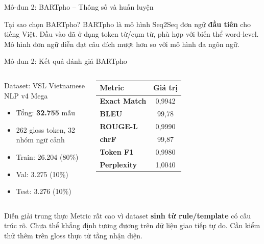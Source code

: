 ﻿\documentclass[aspectratio=169, 11pt]{beamer}
\begin{document}
\begin{frame}{Mô-đun 2: BARTpho -- Thông số và huấn luyện}
    \vspace{0.3cm}
    \begin{alertblock}{\small Tại sao chọn BARTpho?}
        \small BARTpho là mô hình Seq2Seq đơn ngữ \textbf{đầu tiên} cho tiếng Việt. Đầu vào đã ở dạng token từ/cụm từ, phù hợp với biến thể word-level. Mô hình đơn ngữ diễn đạt câu đích mượt hơn so với mô hình đa ngôn ngữ.
    \end{alertblock}
\end{frame}

\begin{frame}{Mô-đun 2: Kết quả đánh giá BARTpho}
    \begin{columns}[T]
        \begin{block}{Dataset: VSL Vietnamese NLP v4 Mega}
            \begin{itemize}\small
                \item Tổng: \textbf{32.755} mẫu
                \item 262 gloss token, 32 nhóm ngữ cảnh
                \item Train: 26.204 {\scriptsize(80\%)}
                \item Val: 3.275 {\scriptsize(10\%)}
                \item Test: 3.276 {\scriptsize(10\%)}
            \end{itemize}
        \end{block}

        \centering
        \begin{tabular}{>{\bfseries\small}l >{\small}c}
            \toprule
            Metric & Giá trị \\
            \midrule
            Exact Match & 0,9942 \\
            BLEU & 99,78 \\
            ROUGE-L & 0,9990 \\
            chrF & 99,87 \\
            Token F1 & 0,9980 \\
            Perplexity & 1,0040 \\
            \bottomrule
        \end{tabular}
    \end{columns}

    \vspace{0.3cm}
    \begin{alertblock}{Diễn giải trung thực}
        \small Metric rất cao vì dataset \textbf{sinh từ rule/template} có cấu trúc rõ. Chưa thể khẳng định tương đương trên dữ liệu giao tiếp tự do. Cần kiểm thử thêm trên gloss thực từ tầng nhận diện.
    \end{alertblock}
\end{frame}
\end{document}
